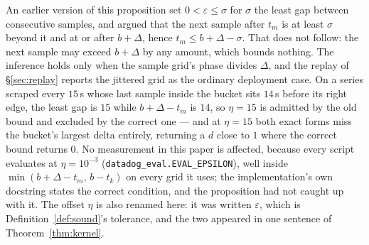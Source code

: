 \begin{remark}\label{rem:eta}
An earlier version of this proposition set $0<\varepsilon\le\sigma$ for $\sigma$ the
least gap between consecutive samples, and argued that the next sample after $t_m$ is at
least $\sigma$ beyond it and at or after $b+\Delta$, hence $t_m\le b+\Delta-\sigma$. That
does not follow: the next sample may exceed $b+\Delta$ by any amount, which bounds
nothing. The inference holds only when the sample grid's phase divides $\Delta$, and the
replay of \S\ref{sec:replay} reports the jittered grid as the ordinary deployment case.
On a series scraped every $15$\,s whose last sample inside the bucket sits $14$\,s
before its right edge, the least gap is $15$ while $b+\Delta-t_m$ is $14$, so $\eta=15$
is admitted by the old bound and excluded by the correct one ---
and at $\eta=15$ both exact forms miss the bucket's largest delta entirely, returning a
$d$ close to $1$ where the correct bound returns $0$.
No measurement in this paper is affected, because every script evaluates at
$\eta=10^{-3}$ (\texttt{datadog\_eval.EVAL\_EPSILON}), well inside
$\min(b+\Delta-t_m,\,b-t_k)$ on every grid it uses; the implementation's own docstring
states the correct condition, and the proposition had not caught up with it. The offset
$\eta$ is also renamed here: it was written $\varepsilon$, which is Definition~\ref{def:sound}'s
tolerance, and the two appeared in one sentence of Theorem~\ref{thm:kernel}.
\end{remark}
